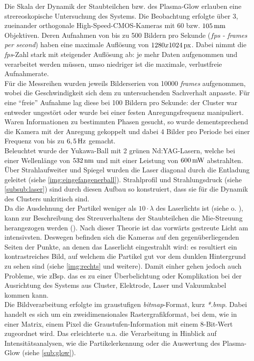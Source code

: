 \documentclass[numbers=noenddot,a4paper]{scrartcl}
\newcommand{\tilt}[1]{\textit{#1}}
\begin{document}
			Die Skala der Dynamik der Staubteilchen bzw. des Plasma-Glow erlauben eine strereoskopische Untersuchung des Systems. Die Beobachtung erfolgte \"uber 3, zueinander orthogonale High-Speed-CMOS-Kameras mit 60 bzw. $\unit[105]{mm}$ Objektiven. Deren Aufnahmen von bis zu 500 Bildern pro Sekunde ($\unit{fps}$ - \tilt{frames per second}) haben eine maximale Aufl\"osung von $\unit[1280x1024]{px}$. Dabei nimmt die \tilt{fps}-Zahl stark mit steigender Auflösung ab: je mehr Daten aufgenommen und verarbeitet werden müssen, umso niedriger ist die maximale, verlustfreie Aufnahmerate.\\
			Für die Messreihen wurden jeweils Bilderserien von 10000 \tilt{frames} aufgenommen, wobei die Geschwindigkeit sich dem zu untersuchenden Sachverhalt anpasste. F\"ur eine "`freie"' Aufnahme lag diese bei 100 Bildern pro Sekunde: der Cluster war entweder ungest\"ort oder wurde bei einer festen Anregungsfrequenz manipuliert. Waren Informationen zu bestimmten Phasen gesucht, so wurde dementsprechend die Kamera mit der Anregung gekoppelt und dabei 4 Bilder pro Periode bei einer Frequenz von bis zu $\unit[6,5]{Hz}$ gemacht. \\
			Beleuchtet wurde der Yukawa-Ball mit 2 gr\"unen Nd:YAG-Lasern, welche bei einer Wellenl\"ange von $\unit[532]{nm}$ und mit einer Leistung von $\unit[600]{mW}$ abstrahlten. Über Strahlaufweiter und Spiegel wurden die Laser diagonal durch die Entladung geleitet (siehe \ref{img:eingefangenerball}). Strahlprofil und Strahlungsdruck (siehe \ref{subsub:laser}) sind durch diesen Aufbau so konstruiert, dass sie f\"ur die Dynamik des Clusters unkritisch sind.\\
			Da die Ausdehnung der Partikel weniger als $10\cdot\lambda$ des Laserlichts ist (siehe \cite{Mie08} o. \cite{Hulst81}), kann zur Beschreibung des Streuverhaltens der Staubteilchen die Mie-Streuung herangezogen werden (\cite{Bonitz10}). Nach dieser Theorie ist das vorw\"arts gestreute Licht am intensivsten. Deswegen befinden sich die Kameras auf den gegen\"uberliegenden Seiten der Punkte, an denen das Laserlicht eingestrahlt wird: es resultiert ein kontrastreiches Bild, auf welchem die Partikel gut vor dem dunklen Hintergrund zu sehen sind (siehe \ref{img:rechts} und weitere). Damit einher gehen jedoch auch Probleme, wie zBsp. das es zu einer \"Uberbelichtung oder Komplikation bei der Ausrichtung des Systems aus Cluster, Elektrode, Laser und Vakuumkabel kommen kann.\\
			Die Bildverarbeitung erfolgte im graustufigen \tilt{bitmap}-Format, kurz \tilt{*.bmp}. Dabei handelt es sich um ein zweidimensionales Rastergrafikformat, bei dem, wie in einer Matrix, einem Pixel die Graustufen-Information mit einem 8-Bit-Wert zugeordnet wird. Das erleichterte u.a. die Verarbeitung in Hinblick auf Intensit\"atsanalysen, wie die Partikelerkennung oder die Auswertung des Plasma-Glow (siehe \ref{sub:glow}).
            
\end{document}
